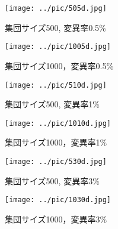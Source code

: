 \documentclass[a4j]{jarticle}
\begin{document}
\begin{figure}[H]
 \begin{minipage}{0.5\hsize}
  \begin{center}
   \texttt{[image: ../pic/505d.jpg]}
  \end{center}
  \caption{集団サイズ500, 変異率0.5\%}
  \label{505d}
 \end{minipage}
 \begin{minipage}{0.5\hsize}
  \begin{center}
   \texttt{[image: ../pic/1005d.jpg]}
  \end{center}
  \caption{集団サイズ1000，変異率0.5\%}
  \label{1005d}
 \end{minipage}
\end{figure}

\begin{figure}[H]
 \begin{minipage}{0.5\hsize}
  \begin{center}
   \texttt{[image: ../pic/510d.jpg]}
  \end{center}
  \caption{集団サイズ500, 変異率1\%}
  \label{510d}
 \end{minipage}
 \begin{minipage}{0.5\hsize}
  \begin{center}
   \texttt{[image: ../pic/1010d.jpg]}
  \end{center}
  \caption{集団サイズ1000，変異率1\%}
  \label{1010d}
 \end{minipage}
\end{figure}

\begin{figure}[H]
 \begin{minipage}{0.5\hsize}
  \begin{center}
   \texttt{[image: ../pic/530d.jpg]}
  \end{center}
  \caption{集団サイズ500, 変異率3\%}
  \label{530d}
 \end{minipage}
 \begin{minipage}{0.5\hsize}
  \begin{center}
   \texttt{[image: ../pic/1030d.jpg]}
  \end{center}
  \caption{集団サイズ1000，変異率3\%}
  \label{1030d}
 \end{minipage}
\end{figure}
\end{document}
